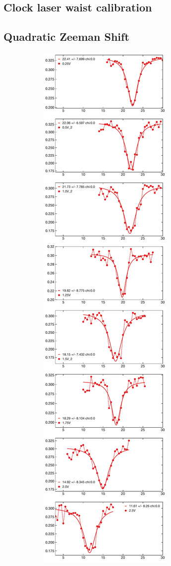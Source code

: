 \subsection{Clock laser waist calibration}
\subsection{Quadratic Zeeman Shift}

		\begin{figure}
		\centering
		\label{fig:qz}
		\begin{subfigure}{0.4\linewidth}
		    \includegraphics[scale=0.4]{figures/qz_spectrum.pdf}

\end{subfigure}
\end{figure}
